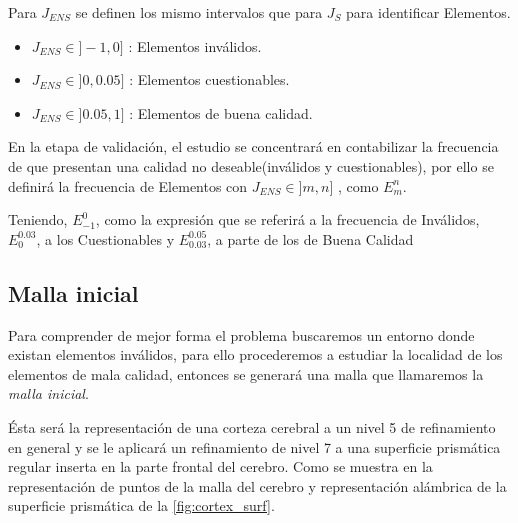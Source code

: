 

Para $J_{ENS}$ se definen los mismo intervalos que para $J_S$ para identificar Elementos.

\begin{itemize}
	\item $J_{ENS} \in ]-1, 0]$ : Elementos inválidos.
	\item $J_{ENS} \in ]0, 0.05]$ : Elementos cuestionables.
	\item $J_{ENS} \in ]0.05, 1]$ : Elementos de buena calidad.
\end{itemize}

En la etapa de validación, el estudio se concentrará en contabilizar la frecuencia de \elements{} que presentan una calidad no deseable(inválidos y cuestionables), por ello se definirá la frecuencia de Elementos con $J_{ENS} \in ]m, n]$ , como $E^{n}_{m}$.

Teniendo, $E_{-1}^{0}$, como la expresión que se referirá a la frecuencia de \elements{} Inválidos, $E_{0}^{0.03}$, a los \elements{} Cuestionables y $E_{0.03}^{0.05}$, a parte de los \elements{} de Buena Calidad


\subsection{Malla inicial}

Para comprender de mejor forma el problema buscaremos un entorno donde existan elementos inválidos, para ello procederemos a estudiar la localidad de los elementos de mala calidad, entonces se generará una malla que llamaremos la \textit{malla inicial}.

Ésta será la representación de una corteza cerebral a un nivel 5 de refinamiento en general y se le aplicará un refinamiento de nivel 7 a una superficie prismática regular inserta en la parte frontal del cerebro. Como se muestra en la representación de puntos de la malla del cerebro y representación alámbrica de la superficie prismática de la \autoref{fig:cortex_surf}.

